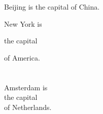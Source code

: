 \documentclass{article}
\begin{document}
	Beijing is
	the capital
	of China.
	
	New York is
	
	the capital
	
	of America.\\\\\\
	Amsterdam is \\ the capital \\
	of Netherlands.
\end{document}
